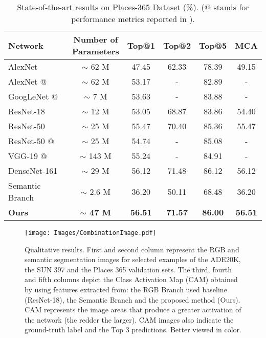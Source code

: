 \documentclass[review, 3p, sort&compress]{elsarticle}
\begin{document}
\begin{table}[t!]
    \begin{centering}
    \footnotesize
    \renewcommand{\arraystretch}{1.2}
    \begin{tabular}{lccccc}
        \hline 
        Network & \makecell{Number of \\ Parameters} & Top@1 & Top@2 & Top@5 & MCA\tabularnewline
        \hline 
        AlexNet & $\mathtt{\sim}$ 62 M & 47.45 & 62.33 & 78.39 & 49.15\tabularnewline
        AlexNet {{@\cite{zhou2018places}}} & $\mathtt{\sim}$ 62 M & 53.17 & - & 82.89 & -\tabularnewline
        GoogLeNet {{@\cite{zhou2018places}}} & $\mathtt{\sim}$ 7 M & 53.63 & - & 83.88 & -\tabularnewline
        ResNet-18 & $\mathtt{\sim}$ 12 M & 53.05 & 68.87 & 83.86 & 54.40\tabularnewline
        ResNet-50 & $\mathtt{\sim}$ 25 M & 55.47 & 70.40 & 85.36 & 55.47\tabularnewline
        ResNet-50 {{@\cite{zhou2018places}}} & $\mathtt{\sim}$ 25 M & 54.74 & - & 85.08 & -\tabularnewline
        VGG-19 {{@\cite{zhou2018places}}} & $\mathtt{\sim}$ 143 M & 55.24 & - & 84.91 & -\tabularnewline
        DenseNet-161 & $\mathtt{\sim}$ 29 M & 56.12 & 71.48 & 86.12 & 56.12\tabularnewline
        \hline 
        Semantic Branch & $\mathtt{\sim}$ 2.6 M & 36.20 & 50.11 & 68.48 & 36.20\tabularnewline
        \textbf{Ours} & \textbf{$\mathtt{\sim}$ 47 M} & \textbf{56.51} & \textbf{71.57} & \textbf{86.00} & \textbf{56.51}\tabularnewline
        \hline 
    \end{tabular}
    \caption{State-of-the-art results on Places-365 Dataset (\%). ({@\cite{zhou2018places}} stands for performance metrics reported in \cite{zhou2018places}).}
    \label{tab:Places365 Results}
    \par\end{centering}
\end{table}

\begin{figure*}[t!]
    \centering
    \texttt{[image: Images/CombinationImage.pdf]}
    \caption{Qualitative results. First and second column represent the RGB and semantic segmentation images for selected examples of the ADE20K, the SUN 397 and the Places 365 validation sets. The third, fourth and fifth columns depict the Class Activation Map (CAM) \cite{zhou2015cnnlocalization} obtained by using features extracted from: the RGB Branch used baseline (ResNet-18), the Semantic Branch and the proposed method (Ours). CAM represents the image areas that produce a greater activation of the network (the redder the larger). CAM images also indicate the ground-truth label and the Top 3 predictions. Better viewed in color.}
    \label{fig:Qualitvate Attention Maps}
\end{figure*}
\end{document}
